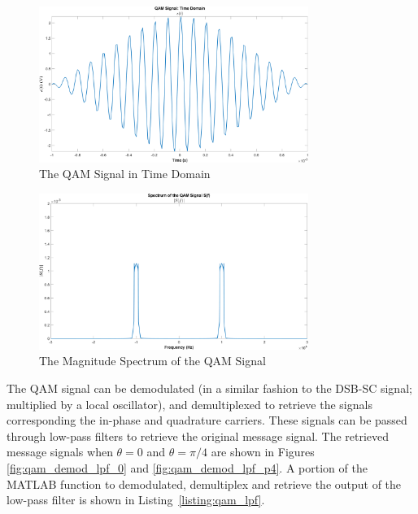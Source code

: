 \documentclass[12pt]{article}
\begin{document}
\begin{figure}[h]
    \centering
    \includegraphics[width=0.78\textwidth]{qam_time}
    \caption{\label{fig:qam_time}The QAM Signal in Time Domain}
\end{figure}
\begin{figure}[h]
    \centering
    \includegraphics[width=0.78\textwidth]{qam_freq}
    \caption{\label{fig:qam_freq}The Magnitude Spectrum of the QAM Signal}
\end{figure} \clearpage

The QAM signal can be demodulated (in a similar fashion to the DSB-SC signal; multiplied by a local oscillator), and demultiplexed to retrieve the signals corresponding the in-phase and quadrature carriers. These signals can be passed through low-pass filters to retrieve the original message signal. The retrieved message signals when $\theta = 0$ and $\theta = \pi/4$ are shown in Figures \ref{fig:qam_demod_lpf_0} and \ref{fig:qam_demod_lpf_p4}. A portion of the MATLAB function to demodulated, demultiplex and retrieve the output of the low-pass filter is shown in Listing~\ref{listing:qam_lpf}.


\end{document}
